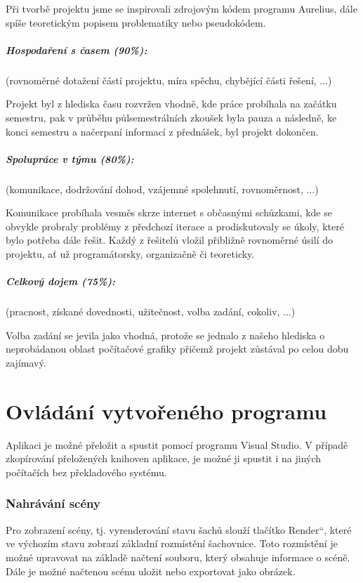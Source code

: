\documentclass[12pt,a4paper,titlepage,final]{report}
\providecommand{\uv}[1]{\quotedblbase #1\textquotedblleft}
\begin{document}
Při tvorbě projektu jsme se inspirovali zdrojovým kódem programu Aurelius, dále spíše teoretickým popisem problematiky nebo pseudokódem.

\paragraph{Hospodaření s časem (90\%):} (rovnoměrné dotažení částí projektu,
míra spěchu, chybějící části řešení, $\ldots$)

Projekt byl z hlediska času rozvržen vhodně, kde práce probíhala na začátku semestru, pak v průběhu půlsemestrálních zkoušek byla pauza a následně, ke konci semestru a načerpaní informací z přednášek, byl projekt dokončen.

\paragraph{Spolupráce v týmu (80\%):} (komunikace, dodržování dohod, vzájemné
spolehnutí, rovnoměrnost, $\ldots$)

Komunikace probíhala vesměs skrze internet s občasnými schůzkami, kde se obvykle probraly problémy z předchozí iterace a prodiskutovaly se úkoly, které bylo potřeba dále řešit. Každý z řešitelů vložil přibližně rovnoměrné úsilí do projektu, ať už programátorsky, organizačně či teoreticky.

\paragraph{Celkový dojem (75\%):} (pracnost, získané dovednosti, užitečnost,
volba zadání, cokoliv, $\ldots$)


Volba zadání se jevila jako vhodná, protože se jednalo z našeho hlediska o neprobádanou oblast počítačové grafiky přičemž projekt zůstával po celou dobu zajímavý.

\chapter{Ovládání vytvořeného programu}
Aplikaci je možné přeložit a spustit pomocí programu Visual Studio. V případě zkopírování přeložených knihoven aplikace, je možné ji spustit i na jiných počítačích bez překladového systému.

\subsection{Nahrávání scény}
Pro zobrazení scény, tj. vyrenderování stavu šachů slouží tlačítko \uv{Render}, které ve výchozím stavu zobrazí základní rozmístění šachovnice. Toto rozmístění je možné upravovat na základě načtení souboru, který obsahuje informace o scéně.
Dále je možné načtenou scénu uložit nebo exportovat jako obrázek.
\end{document}
